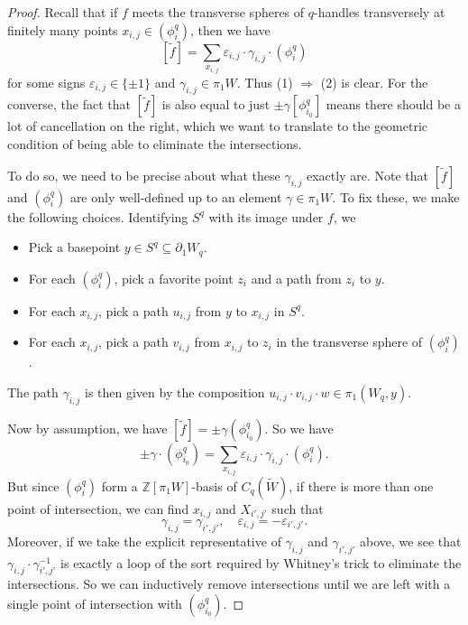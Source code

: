 \documentclass[a4paper, 12pt]{article}
\theoremstyle{definition}
\newcommand\Z{\mathbb{Z}}
\begin{document}
\begin{proof}
  Recall that if $f$ meets the transverse spheres of $q$-handles transversely at finitely many points $x_{i, j} \in (\phi_i^q)$, then we have
  \[
    [\tilde{f}] = \sum_{x_{i, j}}\varepsilon_{i, j}\cdot \gamma_{i, j}\cdot (\phi_i^q)
  \]
  for some signs $\varepsilon_{i, j} \in \{\pm 1\}$ and $\gamma_{i, j} \in \pi_1 W$. Thus (1) $\Rightarrow$ (2) is clear. For the converse, the fact that $[\tilde{f}]$ is also equal to just $\pm \gamma [\phi_{i_0}^q]$ means there should be a lot of cancellation on the right, which we want to translate to the geometric condition of being able to eliminate the intersections.
  
  To do so, we need to be precise about what these $\gamma_{i, j}$ exactly are. Note that $[\tilde{f}]$ and $(\phi_i^q)$ are only well-defined up to an element $\gamma \in \pi_1 W$. To fix these, we make the following choices. Identifying $S^q$ with its image under $f$, we 
  \begin{itemize}
    \item Pick a basepoint $y \in S^q \subseteq \partial_1 W_q$. 
    \item For each $(\phi_i^q)$, pick a favorite point $z_i$ and a path from $z_i$ to $y$.
    \item For each $x_{i, j}$, pick a path $u_{i, j}$ from $y$ to $x_{i, j}$ in $S^q$.
    \item For each $x_{i, j}$, pick a path $v_{i, j}$ from $x_{i, j}$ to $z_i$ in the transverse sphere of $(\phi_i^q)$.
  \end{itemize}
  The path $\gamma_{i, j}$ is then given by the composition $u_{i, j} \cdot v_{i, j} \cdot w \in \pi_1(W_q, y)$.

  Now by assumption, we have $[\tilde f] = \pm \gamma (\phi_{i_0}^q)$. So we have
  \[
    \pm \gamma \cdot (\phi_{i_0}^q) = \sum_{x_{i, j}} \varepsilon_{i, j} \cdot \gamma_{i, j} \cdot (\phi_i^q).
  \]
  But since $(\phi_i^q)$ form a $\Z[\pi_1 W]$-basis of $C_q(\tilde{W})$, if there is more than one point of intersection, we can find $x_{i, j}$ and $X_{i', j'}$ such that
  \[
    \gamma_{i, j} = \gamma_{i', j'},\quad \varepsilon_{i, j} = - \varepsilon_{i', j'}.
  \]
  Moreover, if we take the explicit representative of $\gamma_{i, j}$ and $\gamma_{i', j'}$ above, we see that $\gamma_{i, j} \cdot \gamma_{i', j'}^{-1}$ is exactly a loop of the sort required by Whitney's trick to eliminate the intersections. So we can inductively remove intersections until we are left with a single point of intersection with $(\phi_{i_0}^q)$.
\end{proof}
\end{document}
